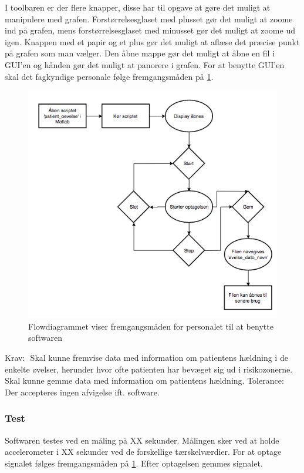 I toolbaren er der flere knapper, disse har til opgave at gøre det muligt at manipulere med grafen. Forstørrelsesglaset med plusset gør det muligt at zoome ind på grafen, mens forstørrelsesglaset med minusset gør det muligt at zoome ud igen. Knappen med et papir og et plus gør det muligt at aflæse det præcise punkt på grafen som man vælger. Den åbne mappe gør det muligt at åbne en fil i GUI'en og hånden gør det muligt at panorere i grafen.
For at benytte GUI'en skal det fagkyndige personale følge fremgangsmåden på \ref{Fig:fremgangsmåde_software}.
\begin{figure}[H] 
	\centering 
	\includegraphics[scale=0.5]{figures/cProblemloesning/Software_flowdiagram.PNG}
	\caption{Flowdiagrammet viser fremgangsmåden for personalet til at benytte softwaren}
	\label{Fig:fremgangsmåde_software}
\end{figure}


Krav:
 Skal kunne fremvise data med information om patientens hældning i de enkelte øvelser,
herunder hvor ofte patienten har bevæget sig ud i risikozonerne.
 Skal kunne gemme data med information om patientens hældning.
Tolerance:
 Der accepteres ingen afvigelse ift. software.

\subsubsection{Test}
Softwaren testes ved en måling på XX sekunder. Målingen sker ved at holde accelerometer i XX sekunder ved de forskellige tærskelværdier. For at optage signalet følges fremgangsmåden på \ref{Fig:fremgangsmåde_software}. Efter optagelsen gemmes signalet.


